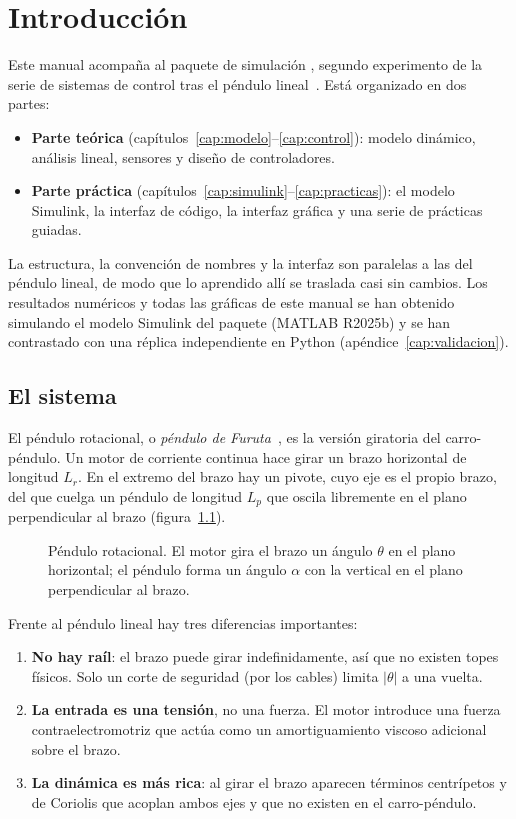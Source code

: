 \chapter{Introducción}
\label{cap:intro}

Este manual acompaña al paquete de simulación , segundo experimento de la serie de sistemas de control tras el péndulo lineal~\cite{lineal}. Está organizado en dos partes:
\begin{itemize}
  \item \textbf{Parte teórica} (capítulos~\ref{cap:modelo}--\ref{cap:control}): modelo dinámico, análisis lineal, sensores y diseño de controladores.
  \item \textbf{Parte práctica} (capítulos~\ref{cap:simulink}--\ref{cap:practicas}): el modelo Simulink, la interfaz de código, la interfaz gráfica y una serie de prácticas guiadas.
\end{itemize}
La estructura, la convención de nombres y la interfaz son paralelas a las del péndulo lineal, de modo que lo aprendido allí se traslada casi sin cambios. Los resultados numéricos y todas las gráficas de este manual se han obtenido simulando el modelo Simulink del paquete (MATLAB R2025b) y se han contrastado con una réplica independiente en Python (apéndice~\ref{cap:validacion}).

\section{El sistema}

El péndulo rotacional, o \emph{péndulo de Furuta}~\cite{furuta1992}, es la versión giratoria del carro-péndulo. Un motor de corriente continua hace girar un brazo horizontal de longitud $L_r$. En el extremo del brazo hay un pivote, cuyo eje es el propio brazo, del que cuelga un péndulo de longitud $L_p$ que oscila libremente en el plano perpendicular al brazo (figura~\ref{fig:sistema}).

\begin{figure}[H]
\centering

\caption{Péndulo rotacional. El motor gira el brazo un ángulo $\theta$ en el plano horizontal; el péndulo forma un ángulo $\alpha$ con la vertical en el plano perpendicular al brazo.}
\label{fig:sistema}
\end{figure}

Frente al péndulo lineal hay tres diferencias importantes:
\begin{enumerate}
  \item \textbf{No hay raíl}: el brazo puede girar indefinidamente, así que no existen topes físicos. Solo un corte de seguridad (por los cables) limita $|\theta|$ a una vuelta.
  \item \textbf{La entrada es una tensión}, no una fuerza. El motor introduce una fuerza contraelectromotriz que actúa como un amortiguamiento viscoso adicional sobre el brazo.
  \item \textbf{La dinámica es más rica}: al girar el brazo aparecen términos centrípetos y de Coriolis que acoplan ambos ejes y que no existen en el carro-péndulo.
\end{enumerate}

